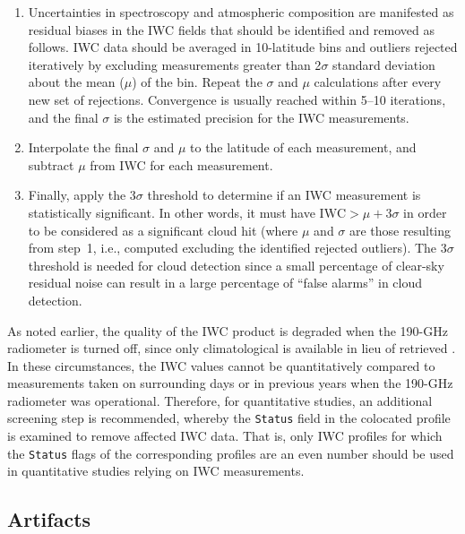 \begin{nofloatpages}
\begin{description}
  \begin{enumerate}
      \item Uncertainties in spectroscopy and atmospheric composition are manifested as residual biases in the IWC fields that should be identified and removed as follows. IWC data should be averaged in 10\degsym-latitude bins and outliers rejected iteratively by excluding measurements greater than 2$\sigma$ standard deviation about the mean ($\mu$) of the bin. Repeat the $\sigma$ and $\mu$ calculations after every new set of rejections. Convergence is usually reached within 5--10 iterations, and the final $\sigma$ is the estimated precision for the IWC measurements.
      \item Interpolate the final $\sigma$ and $\mu$ to the latitude of each measurement, and subtract $\mu$ from IWC for each measurement.
      \item Finally, apply the 3$\sigma$ threshold to determine if an IWC measurement is statistically significant. In other words, it must have $\text{IWC} > \mu + 3\sigma$ in order to be considered as a significant cloud hit (where $\mu$ and $\sigma$ are those resulting from step~1, i.e., computed excluding the identified rejected outliers). The $3\sigma$ threshold is needed for cloud detection since a small percentage of clear-sky residual noise can result in a large percentage of ``false alarms'' in cloud detection.
        \end{enumerate}

        \item[Additional screening on \ch{H2O} \texttt{Status}:] As noted earlier, the quality of the IWC product is degraded when the \mbox{190\nobreakdash-GHz} radiometer is turned off, since only climatological  is available in lieu of retrieved . In these circumstances, the IWC values cannot be quantitatively compared to measurements taken on surrounding days or in previous years when the \mbox{190\nobreakdash-GHz} radiometer was operational. Therefore, for quantitative studies, an additional screening step is recommended, whereby the \texttt{Status} field in the colocated  profile is examined to remove affected IWC data. That is, only IWC profiles for which the \texttt{Status} flags of the corresponding  profiles are an even number should be used in quantitative studies relying on IWC measurements.    
\end{description}
\end{nofloatpages}

\subsection{Artifacts}

